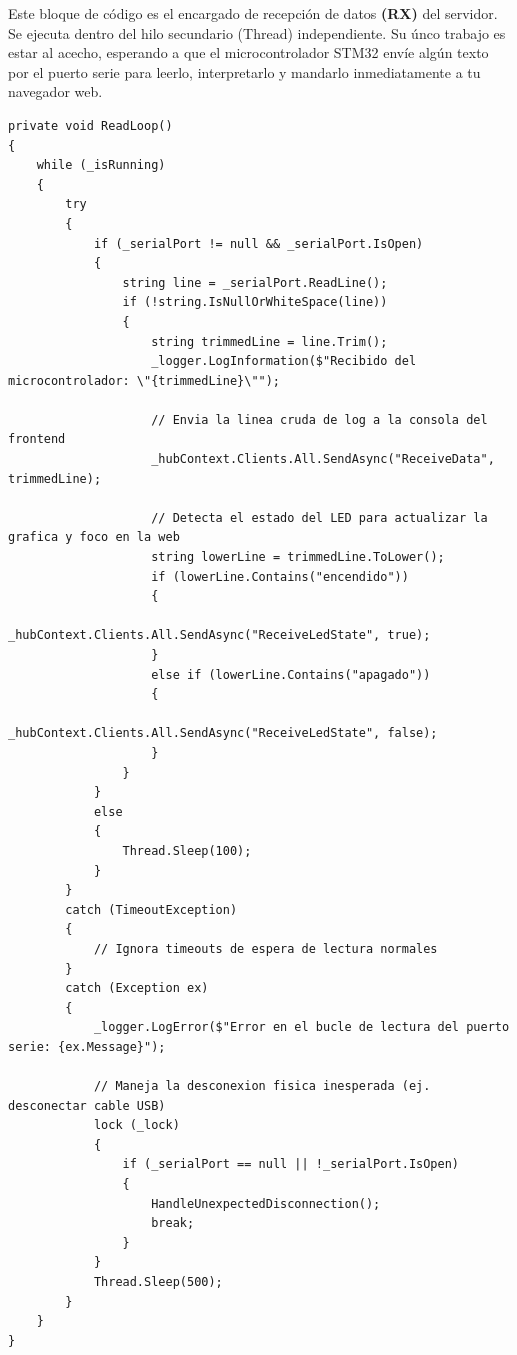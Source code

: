 \documentclass[
10pt, %
a4paper, %
oneside, %
headinclude,footinclude, %
BCOR5mm, %
]{scrartcl}
\begin{document}
\newpage
Este bloque de código es el encargado de recepción de datos \textbf{(RX)} del servidor. Se ejecuta dentro del hilo secundario (Thread) independiente. Su únco trabajo es estar al acecho, esperando a que el microcontrolador STM32 envíe algún texto por el puerto serie para leerlo, interpretarlo y mandarlo inmediatamente a tu navegador web.
\begin{lstlisting}[style=VSCodeDark]
private void ReadLoop()
{
	while (_isRunning)
	{
		try
		{
			if (_serialPort != null && _serialPort.IsOpen)
			{
				string line = _serialPort.ReadLine();
				if (!string.IsNullOrWhiteSpace(line))
				{
					string trimmedLine = line.Trim();
					_logger.LogInformation($"Recibido del microcontrolador: \"{trimmedLine}\"");
					
					// Envia la linea cruda de log a la consola del frontend
					_hubContext.Clients.All.SendAsync("ReceiveData", trimmedLine);
					
					// Detecta el estado del LED para actualizar la grafica y foco en la web
					string lowerLine = trimmedLine.ToLower();
					if (lowerLine.Contains("encendido"))
					{
						_hubContext.Clients.All.SendAsync("ReceiveLedState", true);
					}
					else if (lowerLine.Contains("apagado"))
					{
						_hubContext.Clients.All.SendAsync("ReceiveLedState", false);
					}
				}
			}
			else
			{
				Thread.Sleep(100);
			}
		}
		catch (TimeoutException)
		{
			// Ignora timeouts de espera de lectura normales
		}
		catch (Exception ex)
		{
			_logger.LogError($"Error en el bucle de lectura del puerto serie: {ex.Message}");
			
			// Maneja la desconexion fisica inesperada (ej. desconectar cable USB)
			lock (_lock)
			{
				if (_serialPort == null || !_serialPort.IsOpen)
				{
					HandleUnexpectedDisconnection();
					break;
				}
			}
			Thread.Sleep(500);
		}
	}
}
\end{lstlisting}
\end{document}
